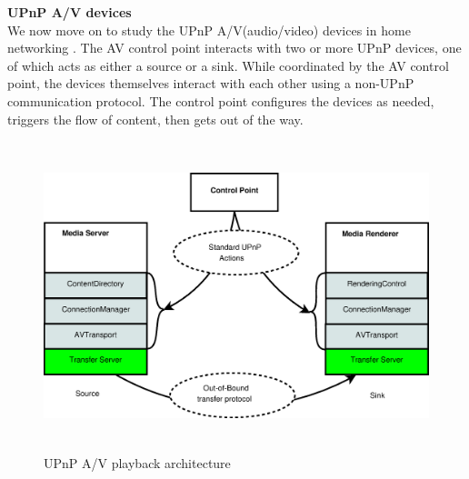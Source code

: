 \textbf{UPnP A/V devices}\\
We now move on to study the UPnP A/V(audio/video) devices in home networking \label{upnpav}. The AV 
control point interacts with two or more UPnP devices, one of which acts as either a source or a 
sink. While coordinated by the AV control point, the devices themselves interact with each other using a non-UPnP communication protocol. The control point configures the devices as needed, triggers the flow of content, then gets out of the way. 

\begin{figure}[htb] 
\centering \includegraphics[height=9cm]{charts/upnp_playback} 
\caption{UPnP A/V playback architecture \label{upnp_playback}} 
\end{figure} 

